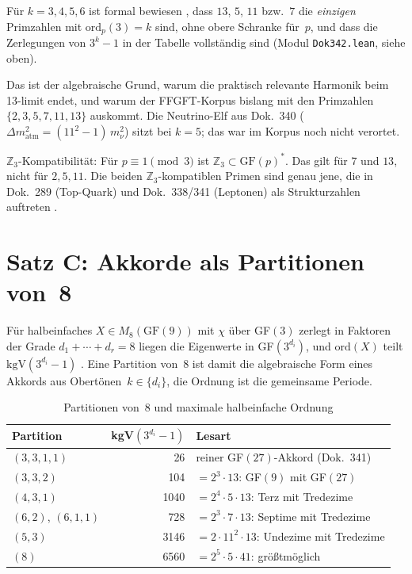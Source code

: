 Für $k=3,4,5,6$ ist formal bewiesen \LM, dass $13$, $5$, $11$ bzw.\ $7$ die
\emph{einzigen} Primzahlen mit $\text{ord}_p(3)=k$ sind, ohne obere Schranke für~$p$,
und dass die Zerlegungen von $3^k-1$ in der Tabelle vollständig sind (Modul
\texttt{Dok342.lean}, siehe oben).

Das ist der algebraische Grund, warum die praktisch relevante Harmonik beim
13-limit endet, und warum der FFGFT-Korpus bislang mit den Primzahlen
$\{2, 3, 5, 7, 11, 13\}$ auskommt. Die Neutrino-Elf aus Dok.~340
($\Delta m^2_\text{atm} = (11^2 - 1)\, m_\nu^2$) sitzt bei $k = 5$; das war im
Korpus noch nicht verortet.

$\mathbb{Z}_3$-Kompatibilität: Für $p \equiv 1 \pmod 3$ ist $\mathbb{Z}_3 \subset \text{GF}(p)^*$.
Das gilt für $7$ und $13$, nicht für $2, 5, 11$. Die beiden $\mathbb{Z}_3$-kompatiblen
Primen sind genau jene, die in Dok.~289 (Top-Quark) und Dok.~338/341 (Leptonen)
als Strukturzahlen auftreten \BM.

\section{Satz C: Akkorde als Partitionen von~8}

Für halbeinfaches $X \in M_8(\text{GF}(9))$ mit $\chi$ über GF$(3)$ zerlegt in
Faktoren der Grade $d_1 + \cdots + d_r = 8$ liegen die Eigenwerte in GF$(3^{d_i})$,
und $\text{ord}(X)$ teilt $\text{kgV}(3^{d_i} - 1)$ \BM. Eine Partition von~8 ist
damit die algebraische Form eines Akkords aus Obertönen~$k \in \{d_i\}$, die
Ordnung ist die gemeinsame Periode.

\begin{table}[H]
\centering
\caption{Partitionen von~8 und maximale halbeinfache Ordnung}
\begin{tabular}{lrl}
\toprule
Partition & kgV$(3^{d_i}{-}1)$ & Lesart \\
\midrule
$(3,3,1,1)$ & 26 & reiner GF$(27)$-Akkord (Dok.~341) \\
$(3,3,2)$ & 104 & $= 2^3 \cdot 13$: GF$(9)$ mit GF$(27)$ \\
$(4,3,1)$ & 1040 & $= 2^4 \cdot 5 \cdot 13$: Terz mit Tredezime \\
$(6,2)$, $(6,1,1)$ & 728 & $= 2^3 \cdot 7 \cdot 13$: Septime mit Tredezime \\
$(5,3)$ & 3146 & $= 2 \cdot 11^2 \cdot 13$: Undezime mit Tredezime \\
$(8)$ & 6560 & $= 2^5 \cdot 5 \cdot 41$: größtmöglich \\
\bottomrule
\end{tabular}
\end{table}

